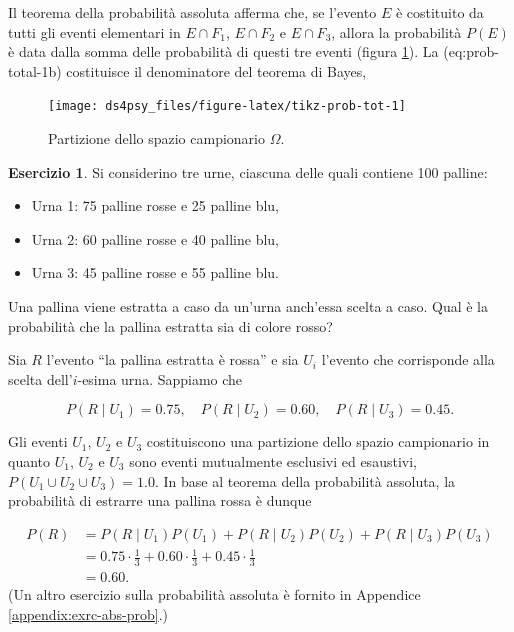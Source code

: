 \documentclass[
  11pt,
]{krantz}
\providecommand{\tightlist}{%
  \setlength{\itemsep}{0pt}\setlength{\parskip}{0pt}}
\theoremstyle{definition}
\theoremstyle{definition}
\theoremstyle{definition}
\newtheorem{exercise}{Esercizio}[chapter]
\theoremstyle{definition}
\theoremstyle{remark}
\begin{document}
Il teorema della probabilità assoluta afferma che, se l'evento \(E\) è costituito da tutti gli eventi elementari in \(E \cap F_1\), \(E \cap F_2\) e \(E \cap F_3\), allora la probabilità \(P(E)\) è data dalla somma delle probabilità di questi tre eventi (figura \ref{fig:tikz-prob-tot}). La \citet{ref}(eq:prob-total-1b) costituisce il denominatore del teorema di Bayes,

\begin{figure}[h]

{\centering \texttt{[image: ds4psy\_files/figure-latex/tikz-prob-tot-1]} 

}

\caption{Partizione dello spazio campionario $\Omega$.}\label{fig:tikz-prob-tot}
\end{figure}

\begin{exercise}
Si considerino tre urne, ciascuna delle quali contiene 100 palline:

\begin{itemize}
\tightlist
\item
  Urna 1: 75 palline rosse e 25 palline blu,
\item
  Urna 2: 60 palline rosse e 40 palline blu,
\item
  Urna 3: 45 palline rosse e 55 palline blu.
\end{itemize}

\noindent Una pallina viene estratta a caso da un'urna anch'essa scelta a caso. Qual è la probabilità che la pallina estratta sia di colore rosso?

Sia \(R\) l'evento ``la pallina estratta è rossa'' e sia \(U_i\) l'evento che corrisponde alla scelta dell'\(i\)-esima urna. Sappiamo che

\[
P(R \mid U_1) = 0.75, \quad P(R \mid U_2) = 0.60, \quad P(R \mid U_3) = 0.45.
\]

Gli eventi \(U_1\), \(U_2\) e \(U_3\) costituiscono una partizione dello spazio campionario in quanto \(U_1\), \(U_2\) e \(U_3\) sono eventi mutualmente esclusivi ed esaustivi, \(P(U_1 \cup U_2 \cup U_3) = 1.0\). In base al teorema della probabilità assoluta, la probabilità di estrarre una pallina rossa è dunque

\[
\begin{split}
P(R) &= P(R \mid U_1)P(U_1)+P(R \mid U_2)P(U_2)+P(R \mid U_3)P(U_3) \\
&= 0.75 \cdot \frac{1}{3}+0.60 \cdot \frac{1}{3}+0.45 \cdot \frac{1}{3} \\
&=0.60.
\end{split}
\] (Un altro esercizio sulla probabilità assoluta è fornito in Appendice \ref{appendix:exrc-abs-prob}.)
\end{exercise}
\end{document}
